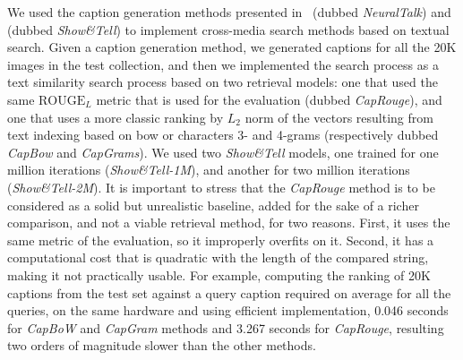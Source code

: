 We used the caption generation methods presented in~\cite{karpathy2015deep} (dubbed \emph{NeuralTalk}) and~\cite{vinyals2015show} (dubbed \emph{Show\&Tell}) to implement cross-media search methods based on textual search.
Given a caption generation method, we generated captions for all the 20K images in the test collection, and then we implemented the search process as a text similarity search process based on two retrieval models: one that used the same $\text{ROUGE}_L$ metric that is used for the evaluation (dubbed \emph{CapRouge}), and one that uses a more classic ranking by $L_2$ norm of the vectors resulting from text indexing based on \acrlong{bow} or characters 3- and 4-grams (respectively dubbed \emph{CapBow} and \emph{CapGrams}).
We used two \emph{Show\&Tell} models, one trained for one million iterations (\emph{Show\&Tell-1M}), and another for two million iterations (\emph{Show\&Tell-2M}).
It is important to stress that the \emph{CapRouge} method is to be considered as a solid but unrealistic baseline, added for the sake of a richer comparison, and not a viable retrieval method, for two reasons.
First, it uses the same metric of the evaluation, so it improperly overfits on it.
Second, it has a computational cost that is quadratic with the length of the compared string, making it not practically usable.
For example, computing the ranking of 20K captions from the test set against a query caption required on average for all the queries, on the same hardware and using efficient implementation, 0.046 seconds for \emph{CapBoW} and \emph{CapGram} methods and 3.267 seconds for \emph{CapRouge}, resulting two orders of magnitude slower than the other methods.

